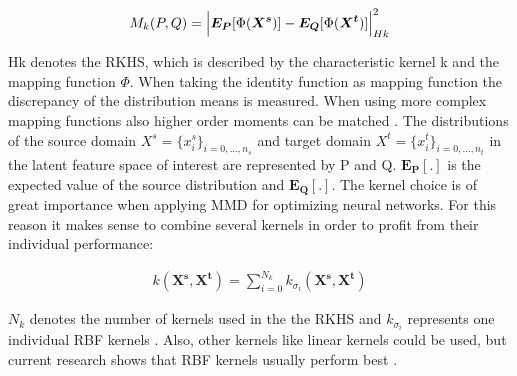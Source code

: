 \begin{align}
    M_{k}(P,Q) = \Bigl|  \boldsymbol{E_{P}}[\Phi(\boldsymbol{X^{s}})] - \boldsymbol{E_{Q}}[\Phi(\boldsymbol{X^{t}})]     \Bigl|^{2}_{Hk}
\end{align}

Hk denotes the RKHS, which is described by the characteristic kernel k and the mapping function $\Phi$. When taking the identity function as mapping function the discrepancy of the distribution means is measured. When using more complex mapping functions also higher order moments can be matched \cite{Yujia2015}. The distributions of the source domain $X^{s} = \{{x}_{i}^{s}\}_{i=0,...,n_{s}}$ and target domain $X^{t} = \{{x}_{i}^{t}\}_{i=0,...,n_{t}}$ in the latent feature space of interest are represented by P and Q. $\boldsymbol{E_{P}[.]}$ is the expected value of the source distribution and $\boldsymbol{E_{Q}[.]}$. The kernel choice is of great importance when applying MMD for optimizing neural networks. For this reason it makes sense to combine several kernels in order to profit from their individual performance:

\begin{align}
    k(\boldsymbol{X^{s}}, \boldsymbol{X^{t}}) = \sum_{i=0}^{N_{k}} k_{\sigma_{i}}(\boldsymbol{X^{s}}, \boldsymbol{X^{t}})
\end{align}

$N_{k}$ denotes the number of kernels used in the the RKHS and $k_{\sigma_{i}}$ represents one individual RBF kernels  \cite{li2020}. Also, other kernels like linear kernels could be used, but current research shows that RBF kernels usually perform best \cite{AZAMFAR2020103932}.

